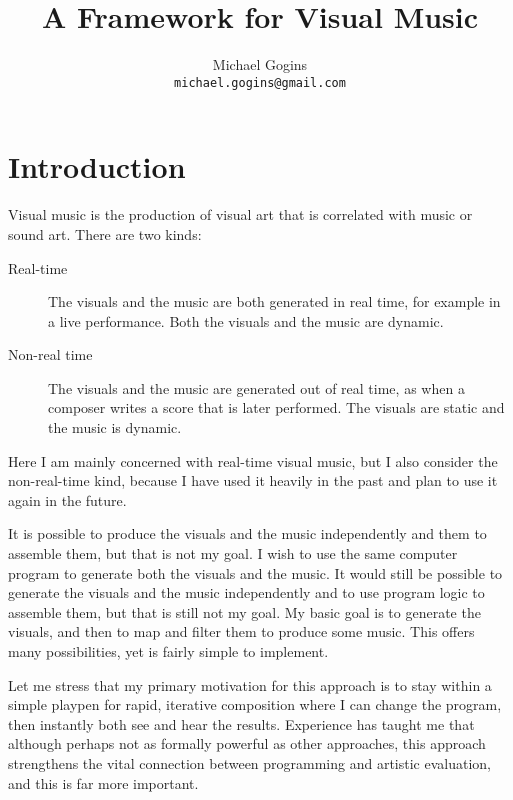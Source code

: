 \documentclass[english,11pt,letterpaper,onecolumn]{scrartcl}
\begin{document}
\title{A Framework for Visual Music}
\author{Michael Gogins \\ \texttt{michael.gogins@gmail.com}}
\maketitle



\section{Introduction}

Visual music is the production of visual art that is correlated with music 
or sound art. There are two kinds:

\begin{description}
 \item[Real-time] The visuals and the music are both generated in real time, 
for example in a live performance. Both the visuals and the music are dynamic.
 \item[Non-real time] The visuals and the music are generated out of real 
time, as when a composer writes a score that is later performed. The visuals 
are static and the music is dynamic.
\end{description}

Here I am mainly concerned with real-time visual music, but I also consider 
the non-real-time kind, because I have used it heavily in the past and plan to 
use it again in the future.

It is possible to produce the visuals and the music independently and them to 
assemble them, but that is not my goal. I wish to use the same computer 
program to generate both the visuals and the music. It 
would still be possible to generate the visuals and the music independently and 
to use program logic to assemble them, but that is still not my goal. My 
basic goal is to generate the visuals, and then to map and filter them to 
produce some music. This offers many possibilities, yet is fairly simple to 
implement.

Let me stress that my primary motivation for this approach is to stay within a 
simple playpen for rapid, iterative composition where I can change the 
program, then instantly both see and hear the results. Experience has taught 
me that although perhaps not as formally powerful as other approaches, this 
approach strengthens the vital connection between programming and artistic 
evaluation, and this is far more important.
\end{document}
